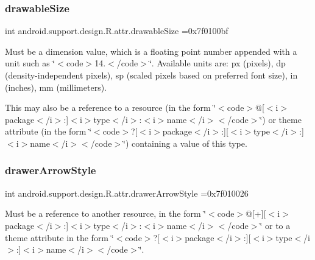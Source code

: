 \subsubsection{\texorpdfstring{drawable\+Size}{drawableSize}}
{\footnotesize\ttfamily int android.\+support.\+design.\+R.\+attr.\+drawable\+Size =0x7f0100bf\hspace{0.3cm}{\ttfamily [static]}}

Must be a dimension value, which is a floating point number appended with a unit such as \char`\"{}$<$code$>$14.\+5sp$<$/code$>$\char`\"{}. Available units are\+: px (pixels), dp (density-\/independent pixels), sp (scaled pixels based on preferred font size), in (inches), mm (millimeters). 

This may also be a reference to a resource (in the form \char`\"{}$<$code$>$@\mbox{[}$<$i$>$package$<$/i$>$\+:\mbox{]}$<$i$>$type$<$/i$>$\+:$<$i$>$name$<$/i$>$$<$/code$>$\char`\"{}) or theme attribute (in the form \char`\"{}$<$code$>$?\mbox{[}$<$i$>$package$<$/i$>$\+:\mbox{]}\mbox{[}$<$i$>$type$<$/i$>$\+:\mbox{]}$<$i$>$name$<$/i$>$$<$/code$>$\char`\"{}) containing a value of this type. \mbox{\label{classandroid_1_1support_1_1design_1_1R_1_1attr_a231b64d73bc7eaef60a4297f2eb9d434}} 
\subsubsection{\texorpdfstring{drawer\+Arrow\+Style}{drawerArrowStyle}}
{\footnotesize\ttfamily int android.\+support.\+design.\+R.\+attr.\+drawer\+Arrow\+Style =0x7f010026\hspace{0.3cm}{\ttfamily [static]}}

Must be a reference to another resource, in the form \char`\"{}$<$code$>$@\mbox{[}+\mbox{]}\mbox{[}$<$i$>$package$<$/i$>$\+:\mbox{]}$<$i$>$type$<$/i$>$\+:$<$i$>$name$<$/i$>$$<$/code$>$\char`\"{} or to a theme attribute in the form \char`\"{}$<$code$>$?\mbox{[}$<$i$>$package$<$/i$>$\+:\mbox{]}\mbox{[}$<$i$>$type$<$/i$>$\+:\mbox{]}$<$i$>$name$<$/i$>$$<$/code$>$\char`\"{}. \mbox{\label{classandroid_1_1support_1_1design_1_1R_1_1attr_ae39cdea84f2a4492abd1e1e9e4415cf1}} 
